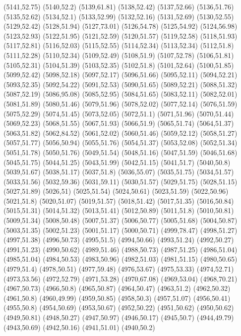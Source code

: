 (5141,52.75)
(5140,52.2)
(5139,61.81)
(5138,52.42)
(5137,52.66)
(5136,51.76)
(5135,52.62)
(5134,52.1)
(5133,52.99)
(5132,52.16)
(5131,52.69)
(5130,52.55)
(5129,52.42)
(5128,51.94)
(5127,73.01)
(5126,54.78)
(5125,54.92)
(5124,56.98)
(5123,52.93)
(5122,51.95)
(5121,52.59)
(5120,51.57)
(5119,52.58)
(5118,51.93)
(5117,52.81)
(5116,52.03)
(5115,52.55)
(5114,52.34)
(5113,52.34)
(5112,51.8)
(5111,52.28)
(5110,52.34)
(5109,52.49)
(5108,51.9)
(5107,52.78)
(5106,51.81)
(5105,52.31)
(5104,51.39)
(5103,52.35)
(5102,51.8)
(5101,52.64)
(5100,51.85)
(5099,52.42)
(5098,52.18)
(5097,52.17)
(5096,51.66)
(5095,52.11)
(5094,52.21)
(5093,52.35)
(5092,54.22)
(5091,52.53)
(5090,51.65)
(5089,52.21)
(5088,51.32)
(5087,52.19)
(5086,95.08)
(5085,52.95)
(5084,51.65)
(5083,52.11)
(5082,52.01)
(5081,51.89)
(5080,51.46)
(5079,51.96)
(5078,52.02)
(5077,52.14)
(5076,51.59)
(5075,52.29)
(5074,51.45)
(5073,52.05)
(5072,51.1)
(5071,51.96)
(5070,51.44)
(5069,52.23)
(5068,51.55)
(5067,51.93)
(5066,51.9)
(5065,51.74)
(5064,51.37)
(5063,51.82)
(5062,84.52)
(5061,52.02)
(5060,51.46)
(5059,52.12)
(5058,51.27)
(5057,51.77)
(5056,50.94)
(5055,51.76)
(5054,51.37)
(5053,52.08)
(5052,51.34)
(5051,51.78)
(5050,51.76)
(5049,51.54)
(5048,51.16)
(5047,51.59)
(5046,51.68)
(5045,51.75)
(5044,51.25)
(5043,51.99)
(5042,51.15)
(5041,51.7)
(5040,50.8)
(5039,51.67)
(5038,51.17)
(5037,51.8)
(5036,55.07)
(5035,51.75)
(5034,51.57)
(5033,51.56)
(5032,59.36)
(5031,59.11)
(5030,51.57)
(5029,51.75)
(5028,51.15)
(5027,51.89)
(5026,51)
(5025,51.54)
(5024,50.61)
(5023,51.59)
(5022,50.96)
(5021,51.8)
(5020,51.07)
(5019,51.57)
(5018,51.42)
(5017,51.35)
(5016,50.84)
(5015,51.31)
(5014,51.32)
(5013,51.41)
(5012,50.89)
(5011,51.8)
(5010,50.81)
(5009,51.34)
(5008,50.48)
(5007,51.37)
(5006,50.77)
(5005,51.68)
(5004,50.87)
(5003,51.35)
(5002,51.23)
(5001,51.17)
(5000,50.71)
(4999,78.47)
(4998,51.27)
(4997,51.38)
(4996,50.73)
(4995,51.5)
(4994,50.66)
(4993,51.24)
(4992,50.27)
(4991,51.23)
(4990,50.62)
(4989,51.46)
(4988,50.73)
(4987,51.25)
(4986,51.04)
(4985,51.04)
(4984,50.53)
(4983,50.96)
(4982,51.03)
(4981,51.15)
(4980,50.65)
(4979,51.4)
(4978,50.51)
(4977,59.48)
(4976,53.67)
(4975,53.33)
(4974,52.71)
(4973,53.56)
(4972,52.79)
(4971,53.28)
(4970,67.08)
(4969,53.04)
(4968,70.21)
(4967,50.73)
(4966,50.8)
(4965,50.87)
(4964,50.47)
(4963,51.2)
(4962,50.32)
(4961,50.8)
(4960,49.99)
(4959,50.85)
(4958,50.3)
(4957,51.07)
(4956,50.41)
(4955,50.8)
(4954,50.69)
(4953,50.67)
(4952,50.22)
(4951,50.62)
(4950,50.62)
(4949,50.81)
(4948,50.27)
(4947,50.97)
(4946,50.17)
(4945,50.7)
(4944,49.79)
(4943,50.69)
(4942,50.16)
(4941,51.01)
(4940,50.2)
